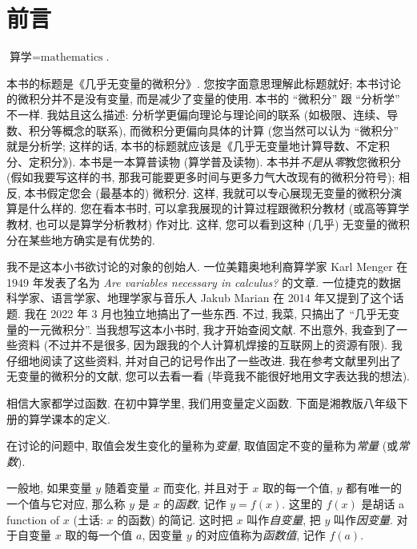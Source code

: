 \chapter*{前言}

\begin{definition*}
    $\text{算学} = \text{mathematics}$.
\end{definition*}

本书的标题是《几乎无变量的微积分》. 您按字面意思理解此标题就好; 本书讨论的微积分并不是没有变量, 而是减少了变量的使用. 本书的 ``微积分'' 跟 ``分析学'' 不一样. 我姑且这么描述: 分析学更偏向理论与理论间的联系 (如极限、连续、导数、积分等概念的联系), 而微积分更偏向具体的计算 (您当然可以认为 ``微积分'' 就是分析学; 这样的话, 本书的标题就应该是《几乎无变量地计算导数、不定积分、定积分》). 本书是一本算普读物 (算学普及读物). 本书并\emph{不是}从\emph{零}教您微积分 (假如我要写这样的书, 那我可能要更多时间与更多力气大改现有的微积分符号); 相反, 本书假定您会 (最基本的) 微积分. 这样, 我就可以专心展现无变量的微积分演算是什么样的. 您在看本书时, 可以拿我展现的计算过程跟微积分教材 (或高等算学教材, 也可以是算学分析教材) 作对比. 这样, 您可以看到这种 (几乎) 无变量的微积分在某些地方确实是有优势的.

我不是这本小书欲讨论的对象的创始人. 一位美籍奥地利裔算学家 Karl Menger 在 1949 年发表了名为 \textit{Are variables necessary in calculus?} 的文章. 一位捷克的数据科学家、语言学家、地理学家与音乐人 Jakub Marian 在 2014 年又提到了这个话题. 我在 2022 年 3 月也独立地搞出了一些东西. 不过, 我菜, 只搞出了 ``几乎无变量的一元微积分''. 当我想写这本小书时, 我才开始查阅文献. 不出意外, 我查到了一些资料 (不过并不是很多, 因为跟我的个人计算机焊接的互联网上的资源有限). 我仔细地阅读了这些资料, 并对自己的记号作出了一些改进. 我在参考文献里列出了无变量的微积分的文献, 您可以去看一看 (毕竟我不能很好地用文字表达我的想法).

相信大家都学过函数. 在初中算学里, 我们用变量定义函数. 下面是湘教版八年级下册的算学课本的定义.

\begin{definition*}
    在讨论的问题中, 取值会发生变化的量称为\emph{变量}, 取值固定不变的量称为\emph{常量} (或\emph{常数}).
\end{definition*}

\begin{definition*}
    一般地, 如果变量 $y$ 随着变量 $x$ 而变化, 并且对于 $x$ 取的每一个值, $y$ 都有唯一的一个值与它对应, 那么称 $y$ 是 $x$ 的\emph{函数}, 记作 $y = f(x)$. 这里的 $f(x)$ 是胡话 a function of $x$ (土话: $x$ 的函数) 的简记. 这时把 $x$ 叫作\emph{自变量}, 把 $y$ 叫作\emph{因变量}. 对于自变量 $x$ 取的每一个值 $a$, 因变量 $y$ 的对应值称为\emph{函数值}, 记作 $f(a)$.
\end{definition*}

